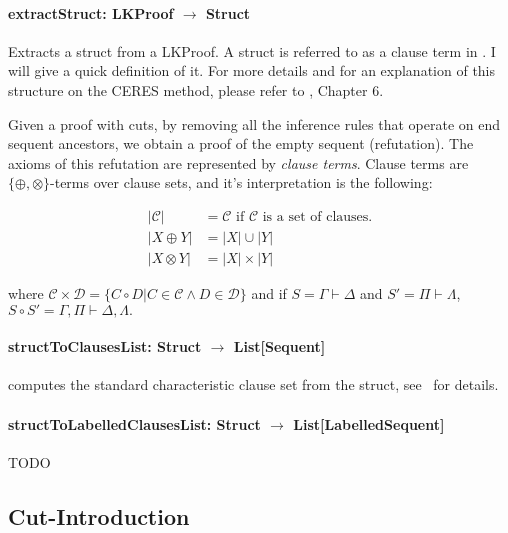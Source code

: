 \documentclass[a4paper, 11pt]{report}
\begin{document}

\paragraph{\textbf{extractStruct: LKProof $\rightarrow$ Struct}}
Extracts a struct from a LKProof. A struct is referred to as a clause term in
\cite{Baaz2011}. I will give a quick definition of it. For more details and
for an explanation of this structure on the CERES method, please refer to
\cite{Baaz2011}, Chapter 6.

Given a proof with cuts, by removing all the inference rules that operate on end
sequent ancestors, we obtain a proof of the empty sequent (refutation). The
axioms of this refutation are represented by \textit{clause terms}. Clause
terms are $\{\oplus, \otimes\}$-terms over clause sets, and it's interpretation
is the following:

\begin{align*}
|\mathcal{C}| &= \mathcal{C} \text{ if $\mathcal{C}$ is a set of clauses.}\\
|X \oplus Y| &= |X| \cup |Y|\\
|X \otimes Y| &= |X| \times |Y|
\end{align*}

where $\mathcal{C} \times \mathcal{D} = \{ C \circ D | C \in \mathcal{C} \wedge
D \in \mathcal{D}\}$ and if $S = \Gamma \vdash \Delta$ and $S' = \Pi \vdash
\Lambda$, $S \circ S' = \Gamma, \Pi \vdash \Delta, \Lambda.$

\paragraph{\textbf{structToClausesList: Struct $\rightarrow$ List[Sequent]}} computes
the standard characteristic clause set
from the struct, see~\cite[Section 4.2.1]{WoltzenlogelPaleo09General} for details.

\paragraph{\textbf{structToLabelledClausesList: Struct $\rightarrow$ List[LabelledSequent]}}
{\color{red}TODO}

\subsection{Cut-Introduction}
\end{document}
